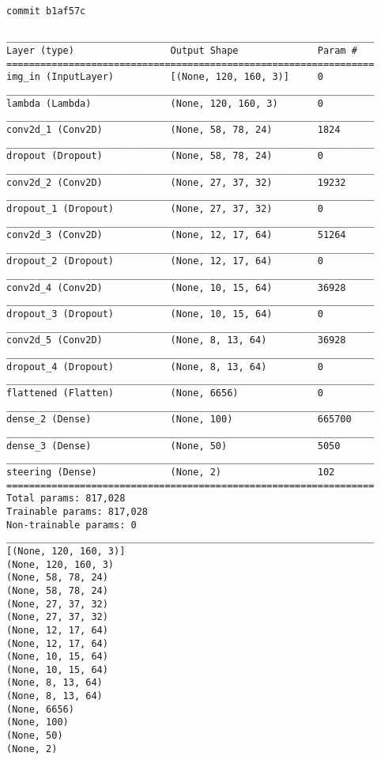 \begin{verbatim}
commit b1af57c

_________________________________________________________________
Layer (type)                 Output Shape              Param #   
=================================================================
img_in (InputLayer)          [(None, 120, 160, 3)]     0         
_________________________________________________________________
lambda (Lambda)              (None, 120, 160, 3)       0         
_________________________________________________________________
conv2d_1 (Conv2D)            (None, 58, 78, 24)        1824      
_________________________________________________________________
dropout (Dropout)            (None, 58, 78, 24)        0         
_________________________________________________________________
conv2d_2 (Conv2D)            (None, 27, 37, 32)        19232     
_________________________________________________________________
dropout_1 (Dropout)          (None, 27, 37, 32)        0         
_________________________________________________________________
conv2d_3 (Conv2D)            (None, 12, 17, 64)        51264     
_________________________________________________________________
dropout_2 (Dropout)          (None, 12, 17, 64)        0         
_________________________________________________________________
conv2d_4 (Conv2D)            (None, 10, 15, 64)        36928     
_________________________________________________________________
dropout_3 (Dropout)          (None, 10, 15, 64)        0         
_________________________________________________________________
conv2d_5 (Conv2D)            (None, 8, 13, 64)         36928     
_________________________________________________________________
dropout_4 (Dropout)          (None, 8, 13, 64)         0         
_________________________________________________________________
flattened (Flatten)          (None, 6656)              0         
_________________________________________________________________
dense_2 (Dense)              (None, 100)               665700    
_________________________________________________________________
dense_3 (Dense)              (None, 50)                5050      
_________________________________________________________________
steering (Dense)             (None, 2)                 102       
=================================================================
Total params: 817,028
Trainable params: 817,028
Non-trainable params: 0
_________________________________________________________________
[(None, 120, 160, 3)]
(None, 120, 160, 3)
(None, 58, 78, 24)
(None, 58, 78, 24)
(None, 27, 37, 32)
(None, 27, 37, 32)
(None, 12, 17, 64)
(None, 12, 17, 64)
(None, 10, 15, 64)
(None, 10, 15, 64)
(None, 8, 13, 64)
(None, 8, 13, 64)
(None, 6656)
(None, 100)
(None, 50)
(None, 2)

\end{verbatim}

